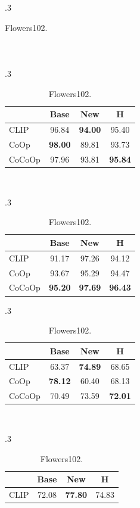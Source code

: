 \documentclass[10pt,twocolumn,letterpaper]{article}
\begin{document}
\begin{table}[t]
\begin{subtable}[t]{.3\textwidth}
\begin{tabular}{l cc|c}
    \bottomrule
    \end{tabular}
    \end{subtable}
    ~
    \begin{subtable}[t]{.3\textwidth}
    \centering
    \caption{Caltech101.}
    \begin{tabular}{l cc|c}
    \toprule
    & Base & New & H \\
    \midrule
    CLIP & 96.84 & \textbf{94.00} & 95.40 \\
    CoOp & \textbf{98.00} & 89.81 & 93.73 \\
    \rowcolor{tabhighlight}
    CoCoOp & 97.96 & 93.81 & \textbf{95.84} \\
    \bottomrule
    \end{tabular}
    \end{subtable}
    ~
    \begin{subtable}[t]{.3\textwidth}
    \centering
    \caption{OxfordPets.}
    \begin{tabular}{l cc|c}
    \toprule
    & Base & New & H \\
    \midrule
    CLIP & 91.17 & 97.26 & 94.12 \\
    CoOp & 93.67 & 95.29 & 94.47 \\
    \rowcolor{tabhighlight}
    CoCoOp & \textbf{95.20} & \textbf{97.69} & \textbf{96.43} \\
    \bottomrule
    \end{tabular}
    \end{subtable}
    \vspace{1em}
    \begin{subtable}[t]{.3\textwidth}
    \centering
    \caption{StanfordCars.}
    \begin{tabular}{l cc|c}
    \toprule
    & Base & New & H \\
    \midrule
    CLIP & 63.37 & \textbf{74.89} & 68.65 \\
    CoOp & \textbf{78.12} & 60.40 & 68.13 \\
    \rowcolor{tabhighlight}
    CoCoOp & 70.49 & 73.59 & \textbf{72.01} \\
    \bottomrule
    \end{tabular}
    \end{subtable}
    ~
    \begin{subtable}[t]{.3\textwidth}
    \centering
    \caption{Flowers102.}
    \begin{tabular}{l cc|c}
    \toprule
    & Base & New & H \\
    \midrule
    CLIP & 72.08 & \textbf{77.80} & 74.83 \\

\end{tabular}
\end{subtable}
\end{table}
\end{document}
